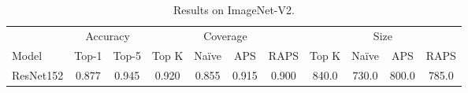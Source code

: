 \begin{table}[t]
    \centering
    \small
    \begin{tabular}{lcccccccccc}
    \toprule
     & \multicolumn{2}{c}{Accuracy}  & \multicolumn{4}{c}{Coverage} & \multicolumn{4}{c}{Size} \\ 
    \cmidrule(r){2-3}  \cmidrule(r){4-7}  \cmidrule(r){8-11}
    Model & Top-1 & Top-5 & Top K & Naïve & APS & RAPS & Top K & Naïve & APS & RAPS \\ 
    \midrule
     ResNet152 &  0.877 &  0.945 & 0.920 & 0.855 & 0.915 & 0.900 & 840.0 & 730.0 & 800.0 & 785.0 \\ 
    \bottomrule
    \end{tabular}
    \caption{Results on ImageNet-V2.} 
    \label{table:imagenet-v2}
\end{table}
